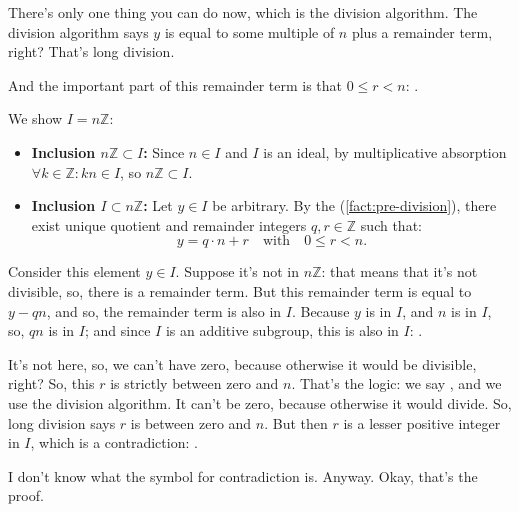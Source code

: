 \begin{proofWrapper}
\begin{speech}[00:53:46 - 00:54:50]
There's only one thing you can do now, which is the division algorithm. The division algorithm says $y$ is equal to some multiple of $n$ plus a remainder term, right?  That's long division.

And the important part of this remainder term is that $0 \le r < n$: .
\end{speech}

\begin{content}
We show $I = n\mathbb{Z}$:
\begin{itemize}
    \item \textbf{Inclusion $n\mathbb{Z} \subset I$:} Since $n \in I$ and $I$ is an ideal, by multiplicative absorption $\forall k \in \mathbb{Z} \colon kn \in I$, so $n\mathbb{Z} \subset I$.
    \item \textbf{Inclusion $I \subset n\mathbb{Z}$:} Let $y \in I$ be arbitrary. By the  (\cref{fact:pre-division}), there exist unique quotient and remainder integers $q, r \in \mathbb{Z}$ such that:
    \begin{equation}\label{eq:division-remainder}
    y = q \cdot n + r \quad \text{with} \quad 0 \le r < n.
    \end{equation}
\end{itemize}
\end{content}

\begin{speech}[00:54:50 - 00:56:10]
Consider this element $y \in I$. Suppose it's not in $n\mathbb{Z}$: that means that it's not divisible, so, there is a remainder term. But this remainder term is equal to $y - qn$, and so, the remainder term is also in $I$. Because $y$ is in $I$, and $n$ is in $I$, so, $qn$ is in $I$; and since $I$ is an additive subgroup, this is also in $I$: .

It's not here, so, we can't have zero, because otherwise it would be divisible, right? So, this $r$ is strictly between zero and $n$. That's the logic: we say , and we use the division algorithm. It can't be zero, because otherwise it would divide. So, long division says $r$ is between zero and $n$. But then $r$ is a lesser positive integer in $I$, which is a contradiction: .

I don't know what the symbol for contradiction is. Anyway. Okay, that's the proof.
\end{speech}


\end{proofWrapper}
